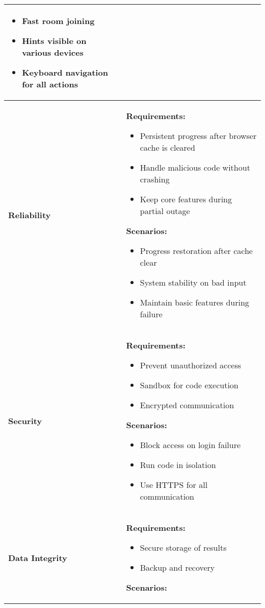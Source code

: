 \begin{tabularx}{\textwidth}{|p{4.8cm}|X|}
    \begin{itemize}
        \item Fast room joining
        \item Hints visible on various devices
        \item Keyboard navigation for all actions
    \end{itemize} \\
    \hline
    \textbf{Reliability} &
    \textbf{Requirements:}
    \begin{itemize}
        \item Persistent progress after browser cache is cleared
        \item Handle malicious code without crashing
        \item Keep core features during partial outage
    \end{itemize}
    \textbf{Scenarios:}
    \begin{itemize}
        \item Progress restoration after cache clear
        \item System stability on bad input
        \item Maintain basic features during failure
    \end{itemize} \\
    \hline
    \textbf{Security} &
    \textbf{Requirements:}
    \begin{itemize}
        \item Prevent unauthorized access
        \item Sandbox for code execution
        \item Encrypted communication
    \end{itemize}
    \textbf{Scenarios:}
    \begin{itemize}
        \item Block access on login failure
        \item Run code in isolation
        \item Use HTTPS for all communication
    \end{itemize} \\
    \hline
    \textbf{Data Integrity} &
    \textbf{Requirements:}
    \begin{itemize}
        \item Secure storage of results
        \item Backup and recovery
    \end{itemize}
    \textbf{Scenarios:}
    \begin{itemize}

\end{itemize}
\end{tabularx}
